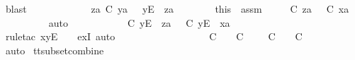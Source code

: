\begin{isabellebody}
\ blast\isanewline
\ \ \ \ \isamarkupfalse%
\isanewline
\ \ \ \ \ \ \isamarkupfalse%
\ {\isachardoublequoteopen}za\ {\isasymle}\isactrlsub C\ ya{\isachardoublequoteclose}\ {\isachardoublequoteopen}{\isasymsigma}{\isacharprime}\ {\isacharequal}\ {\isacharbrackleft}y{\isacharbrackright}\isactrlsub E\ {\isacharhash}\ za{\isachardoublequoteclose}\isanewline
\ \ \ \ \ \ \isamarkupfalse%
\ this\ \ assm{}\ \isamarkupfalse%
\ {\isasymrho}{\isacharprime}\ \ {\isachardoublequoteopen}{\isasymrho}{\isacharprime}\ {\isasymsubseteq}\isactrlsub C\ za\ {\isasymand}\ {\isasymrho}{\isacharprime}\ {\isasymle}\isactrlsub C\ xa{\isachardoublequoteclose}\isanewline
\ \ \ \ \ \ \ \ \isamarkupfalse%
\ auto\isanewline
\ \ \ \ \ \ \isamarkupfalse%
\ \isamarkupfalse%
\ {\isachardoublequoteopen}{\isasymexists}{\isasymrho}{\isacharprime}{\isachardot}\ {\isasymrho}{\isacharprime}\ {\isasymsubseteq}\isactrlsub C\ {\isacharbrackleft}y{\isacharbrackright}\isactrlsub E\ {\isacharhash}\ za\ {\isasymand}\ {\isasymrho}{\isacharprime}\ {\isasymle}\isactrlsub C\ {\isacharbrackleft}y{\isacharbrackright}\isactrlsub E\ {\isacharhash}\ xa{\isachardoublequoteclose}\isanewline
\ \ \ \ \ \ \ \ \isamarkupfalse%
\ {\isacharparenleft}rule{\isacharunderscore}tac\ x{\isacharequal}{\isachardoublequoteopen}{\isacharbrackleft}y{\isacharbrackright}\isactrlsub E\ {\isacharhash}\ {\isasymrho}{\isacharprime}{\isachardoublequoteclose}\ \ exI{\isacharcomma}\ auto{\isacharparenright}\isanewline
\ \ \ \ \isamarkupfalse%
\isanewline
\ \ \isamarkupfalse%
\ \ \ \ \isanewline
\ \ \isamarkupfalse%
\ \isamarkupfalse%
\ {\isachardoublequoteopen}{\isasymsigma}{\isacharprime}\ {\isasymle}\isactrlsub C\ {\isasymsigma}\ {\isasymLongrightarrow}\ {\isasymrho}\ {\isasymsubseteq}\isactrlsub C\ {\isasymsigma}\ {\isasymLongrightarrow}\ {\isasymexists}{\isasymrho}{\isacharprime}{\isachardot}\ {\isasymrho}{\isacharprime}\ {\isasymsubseteq}\isactrlsub C\ {\isasymsigma}{\isacharprime}\ {\isasymand}\ {\isasymrho}{\isacharprime}\ {\isasymle}\isactrlsub C\ {\isasymrho}{\isachardoublequoteclose}\isanewline
\ \ \ \ \isamarkupfalse%
\ auto\isanewline
{}\isamarkupfalse%
%
\endisatagproof
{\isafoldproof}%
%
\isadelimproof
\isanewline
%
\endisadelimproof
\isanewline
{}\isamarkupfalse%
\ tt{\isacharunderscore}subset{\isacharunderscore}combine{\isacharcolon}\isanewline

\end{isabellebody}
